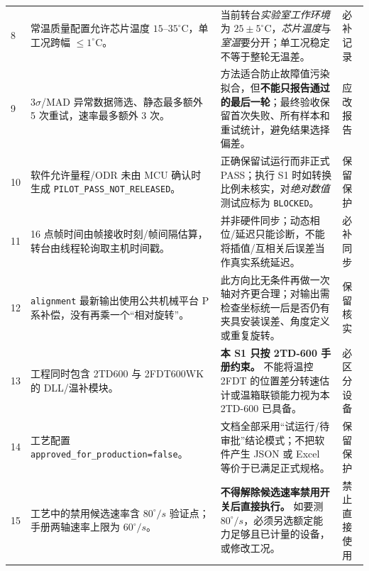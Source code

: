 \begin{longtable}{C{9mm}p{46mm}p{70mm}p{22mm}}
8 & 常温质量配置允许芯片温度 $15$--$35^\circ$C，单工况跨幅 $\le1^\circ$C。 & 当前转台\emph{实验室工作环境}为 $25\pm5^\circ$C，\emph{芯片温度}与\emph{室温}要分开；单工况稳定不等于整轮无温差。 & 必补记录\\
9 & 3$\sigma$/MAD 异常数据筛选、静态最多额外 5 次重试，速率最多额外 3 次。 & 方法适合防止故障值污染拟合，但\textbf{不能只报告通过的最后一轮}；最终验收保留首次失败、所有样本和重试统计，避免结果选择偏差。 & 应改报告\\
10 & 软件允许量程/ODR 未由 MCU 确认时生成 \texttt{PILOT\_PASS\_}\allowbreak\texttt{NOT\_RELEASED}。 & 正确保留试运行而非正式 PASS；执行 S1 时如转换比例未核实，对\emph{绝对数值}测试应标为 \texttt{BLOCKED}。 & 保留保护\\
11 & 16 点帧时间由帧接收时刻/帧间隔估算，转台由线程轮询取主机时间戳。 & 并非硬件同步；动态相位/延迟只能诊断，不能将插值/互相关后误差当作真实系统延迟。 & 必补同步\\
12 & \texttt{alignment} 最新输出使用公共机械平台 P 系补偿，没有再乘一个“相对旋转”。 & 此方向比无条件再做一次轴对齐更合理；对输出需检查坐标统一后是否仍有夹具安装误差、角度定义或重复旋转。 & 保留核实\\
13 & 工程同时包含 2TD600 与 2FDT600WK 的 DLL/温补模块。 & \textbf{本 S1 只按 2TD-600 手册约束。} 不能将温控 2FDT 的位置差分转速估计或温箱联锁能力视为本 2TD-600 已具备。 & 必区分设备\\
14 & 工艺配置 \texttt{approved\_for\_}\allowbreak\texttt{production=false}。 & 文档全部采用“试运行/待审批”结论模式；不把软件产生 JSON 或 Excel 等价于已满足正式规格。 & 保留保护\\
15 & 工艺中的禁用候选速率含 $80^\circ/s$ 验证点；手册两轴速率上限为 $60^\circ/s$。 & \textbf{不得解除候选速率禁用开关后直接执行。} 如要测 $80^\circ/s$，必须另选额定能力足够且已计量的设备，或修改工况。 & 禁止直接使用\\\bottomrule
\end{longtable}
